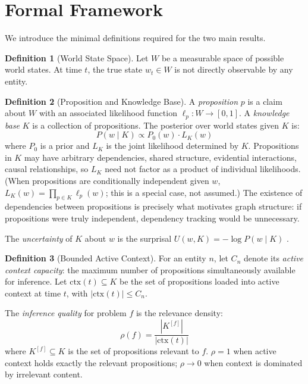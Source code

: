 \documentclass[11pt]{article}
\theoremstyle{definition}
\newtheorem{definition}{Definition}
\begin{document}
\section{Formal Framework}
\label{sec:framework}

We introduce the minimal definitions required for the two main results.

\begin{definition}[World State Space]
\label{def:world}
Let $W$ be a measurable space of possible world states. At time $t$, the
true state $w_t \in W$ is not directly observable by any entity.
\end{definition}

\begin{definition}[Proposition and Knowledge Base]
\label{def:knowledge}
A \emph{proposition} $p$ is a claim about $W$ with an associated
likelihood function $\ell_p : W \to [0,1]$. A \emph{knowledge base} $K$
is a collection of propositions. The posterior over world states given
$K$ is:
\[
P(w \mid K) \propto P_0(w) \cdot L_K(w)
\]
where $P_0$ is a prior and $L_K$ is the joint likelihood determined by
$K$. Propositions in $K$ may have arbitrary dependencies, shared
structure, evidential interactions, causal relationships, so $L_K$ need
not factor as a product of individual likelihoods. (When propositions
are conditionally independent given $w$, $L_K(w) = \prod_{p \in K}
\ell_p(w)$; this is a special case, not assumed.) The existence of
dependencies between propositions is precisely what motivates graph
structure: if propositions were truly independent, dependency tracking
would be unnecessary.

The \emph{uncertainty} of $K$ about $w$ is the
surprisal $U(w, K) = -\log P(w \mid K)$ \cite{Shannon1948, Cover2006}.
\end{definition}

\begin{definition}[Bounded Active Context]
\label{def:context}
For an entity $n$, let $C_n$ denote its \emph{active context capacity}:
the maximum number of propositions simultaneously available for
inference. Let
$\mathrm{ctx}(t) \subseteq K$ be the set of propositions loaded into
active context at time $t$, with $|\mathrm{ctx}(t)| \leq C_n$.

The \emph{inference quality} for problem $f$ is the relevance density:
\[
\rho(f) = \frac{|K^{[f]}|}{|\mathrm{ctx}(t)|}
\]
where $K^{[f]} \subseteq K$ is the set of propositions relevant to $f$.
$\rho = 1$ when active context holds exactly the relevant propositions;
$\rho \to 0$ when context is dominated by irrelevant content.
\end{definition}
\end{document}
